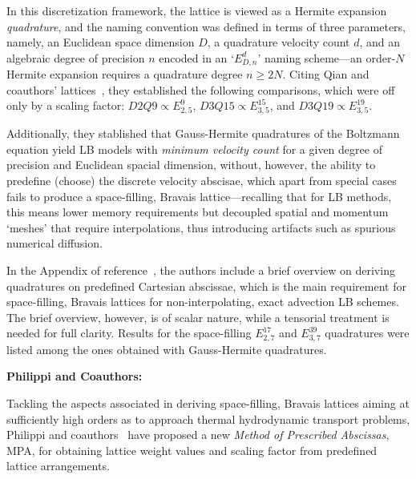     In this discretization framework, the lattice is viewed as a Hermite expansion \emph{quadrature}, and the naming  convention
    was defined in terms of three parameters, namely, an Euclidean space dimension $D$, a quadrature velocity count $d$, and  an
    algebraic degree of precision $n$ encoded in an `$E_{D,n}^{d}$' naming scheme---an order-$N$ Hermite  expansion  requires  a
    quadrature degree $n \geqslant 2N$. Citing Qian  and  coauthors'  lattices~\cite{1992-QianYH+LallemandP-EuroPhysLett},  they
    established the following comparisons, which were off only by a scaling factor: $D2Q9 \propto E_{2,5}^{9}$,  $D3Q15  \propto
    E_{3,5}^{15}$, and $D3Q19 \propto E_{3,5}^{19}$.

    Additionally, they stablished that Gauss-Hermite quadratures of the Boltzmann equation yield LB  models  with  \emph{minimum
    velocity count} for a given degree of precision and Euclidean spacial dimension, without, however, the ability to  predefine
    (choose) the discrete velocity abscisae,  which  apart  from  special  cases  fails  to  produce  a  space-filling,  Bravais
    lattice---recalling that for LB methods, this means lower memory requirements but decoupled spatial  and  momentum  `meshes'
    that require interpolations, thus introducing artifacts such as spurious numerical diffusion.

    In the  Appendix  of  reference~\cite{2006-ShanX+ChenH-JFluidMech},  the  authors  include  a  brief  overview  on  deriving
    quadratures on predefined Cartesian abscissae, which is  the  main  requirement  for  space-filling,  Bravais  lattices  for
    non-interpolating, exact advection LB schemes. The brief overview, however, is of scalar nature, while a tensorial treatment
    is needed for full clarity. Results for the space-filling $E_{2,7}^{17}$ and $E_{3,7}^{39}$ quadratures  were  listed  among
    the ones obtained with Gauss-Hermite quadratures.



    \vspace{2.0mm}\noindent\textbf{Philippi and Coauthors:}\vspace{1.0mm}

    Tackling the aspects associated in deriving space-filling, Bravais  lattices  aiming  at  sufficiently  high  orders  as  to
    approach thermal hydrodynamic  transport  problems,  Philippi  and  coauthors~\cite{2006-PhilippiPC+SurmasR-PhysRevE}  have
    proposed a new \emph{Method of Prescribed Abscissas\/}, MPA, for obtaining lattice weight values  and  scaling  factor  from
    predefined lattice arrangements.

